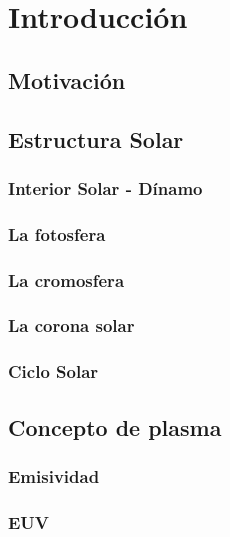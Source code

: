 
\chapter{Introducción}
\section{Motivación}

\section{Estructura Solar}
\subsection{Interior Solar - Dínamo}
\subsection{La fotosfera}
\subsection{La cromosfera}
\subsection{La corona solar}
\subsection{Ciclo Solar}

\section{Concepto de plasma}
\subsection{Emisividad}
\subsection{EUV}
